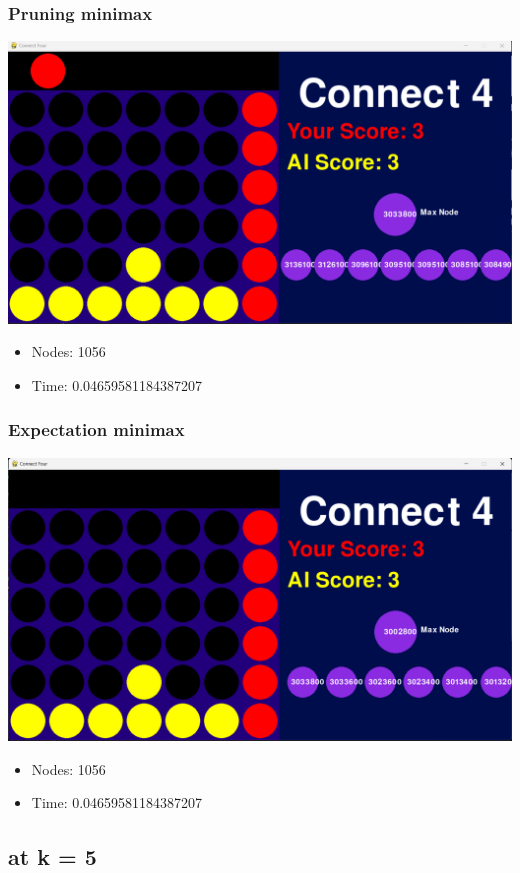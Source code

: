 \documentclass{article}
\begin{document}
\subsubsection*{Pruning minimax}
\begin{center}
    \includegraphics[width=0.8\linewidth]{pruning3.png}
\end{center}
\begin{itemize}
    \item Nodes: 1056
    \item Time: 0.04659581184387207
\end{itemize}
\subsubsection*{Expectation minimax}
\begin{center}
    \includegraphics[width=0.8\linewidth]{testcase.png}
\end{center}
\begin{itemize}
    \item Nodes: 1056
    \item Time: 0.04659581184387207
\end{itemize}
\subsection*{at k = 5}
\end{document}
